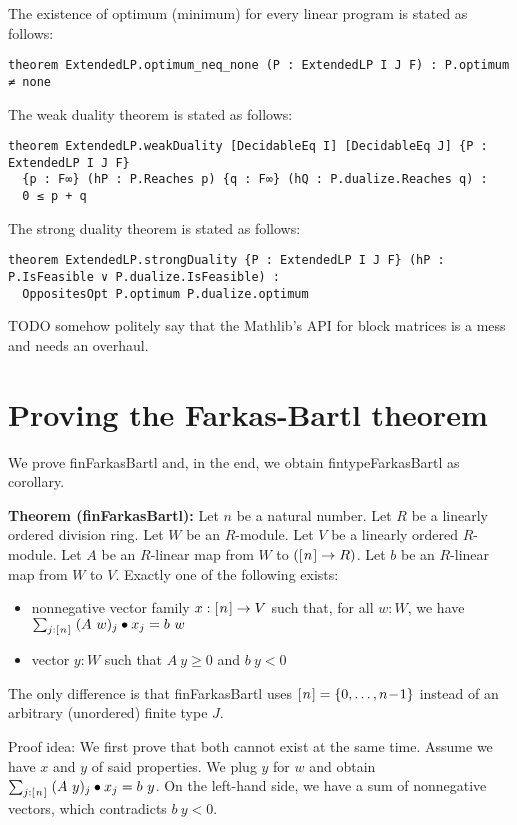 \documentclass[]{article}
\renewcommand{\.}{\hskip .75pt}
\newcommand{\fin}[1]{[\.#1\.]}
\let\r=\rightarrow
\begin{document}
The existence of optimum (minimum) for every linear program is stated as follows:
\begin{lstlisting}
theorem ExtendedLP.optimum_neq_none (P : ExtendedLP I J F) : P.optimum ≠ none
\end{lstlisting}
The weak duality theorem is stated as follows:
\begin{lstlisting}
theorem ExtendedLP.weakDuality [DecidableEq I] [DecidableEq J] {P : ExtendedLP I J F}
  {p : F∞} (hP : P.Reaches p) {q : F∞} (hQ : P.dualize.Reaches q) :
  0 ≤ p + q
\end{lstlisting}
The strong duality theorem is stated as follows:
\begin{lstlisting}
theorem ExtendedLP.strongDuality {P : ExtendedLP I J F} (hP : P.IsFeasible ∨ P.dualize.IsFeasible) :
  OppositesOpt P.optimum P.dualize.optimum
\end{lstlisting}
TODO somehow politely say that the Mathlib's API for block matrices
is a mess and needs an overhaul.


\section {Proving the Farkas-Bartl theorem}

We prove finFarkasBartl and, in the end, we obtain fintypeFarkasBartl as corollary.

\medskip \noindent
\textbf{Theorem (finFarkasBartl):}
Let $n$ be a natural number.
Let $R$ be a linearly ordered division ring.
Let $W$ be an $R$-module.
Let $V$ be a linearly ordered $R$-module.
Let $A$ be an $R$-linear map from $W$ to $(\fin{n} \r R)$.
Let $b$ be an $R$-linear map from $W$ to $V$.
Exactly one of the following exists:
\begin{itemize}
\item nonnegative vector family $x : \fin{n} \r V$ such that, for all $w : W$, we have
$ \sum_{j : \fin{n}}\; (A~w)_j \bullet x_j = b~w $
\item vector $y : W$ such that $A~y \ge 0$ and $b~y < 0$
\end{itemize}
The only difference is that finFarkasBartl uses $\fin{n} = \{ 0, \dots, n\!-\!1 \}$
instead of an arbitrary (unordered) finite type $J$.

\medskip \noindent
Proof idea:
We first prove that both cannot exist at the same time.
Assume we have $x$ and $y$ of said properties.
We plug $y$ for $w$ and obtain
$ \sum_{j : \fin{n}}\; (A~y)_j \bullet x_j = b~y $.
On the left-hand side, we have a sum of nonnegative vectors,
which contradicts $b~y < 0$.
\smallskip
\end{document}
